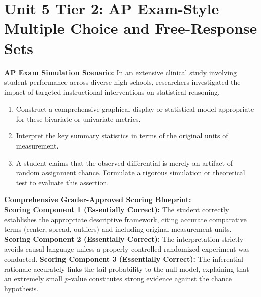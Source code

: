 \section{Unit 5 Tier 2: AP Exam-Style Multiple Choice and Free-Response Sets}
\begin{workbookbox}
\textbf{AP Exam Simulation Scenario:} In an extensive clinical study involving student performance across diverse high schools, researchers investigated the impact of targeted instructional interventions on statistical reasoning.
\begin{enumerate}[label=(\alph*)]
  \item Construct a comprehensive graphical display or statistical model appropriate for these bivariate or univariate metrics.
  \item Interpret the key summary statistics in terms of the original units of measurement.
  \item A student claims that the observed differential is merely an artifact of random assignment chance. Formulate a rigorous simulation or theoretical test to evaluate this assertion.
\end{enumerate}
\textbf{Comprehensive Grader-Approved Scoring Blueprint:}\\
\textbf{Scoring Component 1 (Essentially Correct):} The student correctly establishes the appropriate descriptive framework, citing accurate comparative terms (center, spread, outliers) and including original measurement units.
\textbf{Scoring Component 2 (Essentially Correct):} The interpretation strictly avoids causal language unless a properly controlled randomized experiment was conducted.
\textbf{Scoring Component 3 (Essentially Correct):} The inferential rationale accurately links the tail probability to the null model, explaining that an extremely small $p$-value constitutes strong evidence against the chance hypothesis.
\end{workbookbox}\vspace{6pt}
